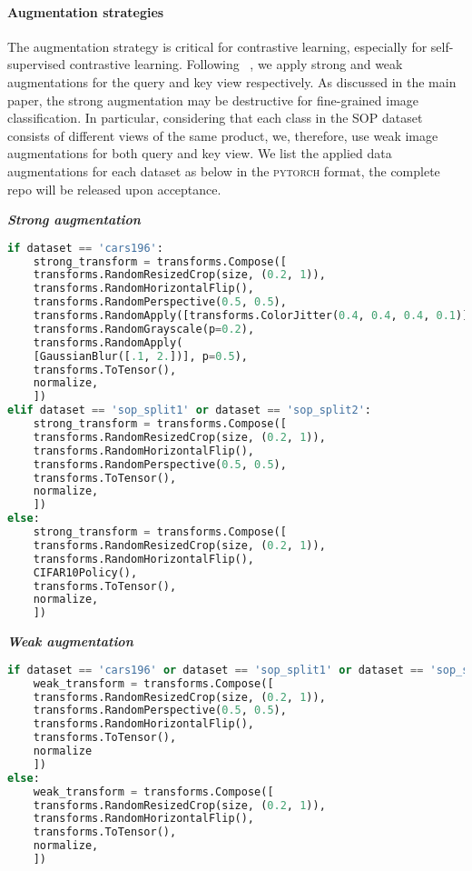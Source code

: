 \documentclass[10pt,twocolumn,letterpaper]{article}
\begin{document}
\paragraph{Augmentation strategies}
The augmentation strategy is critical for contrastive learning, especially for self-supervised contrastive learning. Following ~\cite{ascl, zheng2021ressl}, we apply strong and weak augmentations for the query and key view respectively. As discussed in the main paper, the strong augmentation may be destructive for fine-grained image classification. In particular, considering that each class in the SOP dataset consists of different views of the same product, we, therefore, use weak image augmentations for both query and key view. We list the applied data augmentations for each dataset as below in the \textsc{pytorch} format, the complete repo will be released upon acceptance.

\noindent\textit{\textbf{Strong augmentation}}
\begin{lstlisting}[language=Python]
if dataset == 'cars196':
    strong_transform = transforms.Compose([
    transforms.RandomResizedCrop(size, (0.2, 1)),
    transforms.RandomHorizontalFlip(),
    transforms.RandomPerspective(0.5, 0.5),
    transforms.RandomApply([transforms.ColorJitter(0.4, 0.4, 0.4, 0.1)], p=0.8),
    transforms.RandomGrayscale(p=0.2),
    transforms.RandomApply(
    [GaussianBlur([.1, 2.])], p=0.5),
    transforms.ToTensor(),
    normalize,
    ])
elif dataset == 'sop_split1' or dataset == 'sop_split2':
    strong_transform = transforms.Compose([
    transforms.RandomResizedCrop(size, (0.2, 1)),
    transforms.RandomHorizontalFlip(),
    transforms.RandomPerspective(0.5, 0.5),
    transforms.ToTensor(),
    normalize,
    ])
else:
    strong_transform = transforms.Compose([
    transforms.RandomResizedCrop(size, (0.2, 1)),
    transforms.RandomHorizontalFlip(),
    CIFAR10Policy(),
    transforms.ToTensor(),
    normalize,
    ])
\end{lstlisting}
\noindent\textit{\textbf{Weak augmentation}}
\begin{lstlisting}[language=Python]
if dataset == 'cars196' or dataset == 'sop_split1' or dataset == 'sop_split2':
    weak_transform = transforms.Compose([
    transforms.RandomResizedCrop(size, (0.2, 1)),
    transforms.RandomPerspective(0.5, 0.5),
    transforms.RandomHorizontalFlip(),
    transforms.ToTensor(),
    normalize
    ])
else:
    weak_transform = transforms.Compose([
    transforms.RandomResizedCrop(size, (0.2, 1)),
    transforms.RandomHorizontalFlip(),
    transforms.ToTensor(),
    normalize,
    ])
\end{lstlisting}
\end{document}
